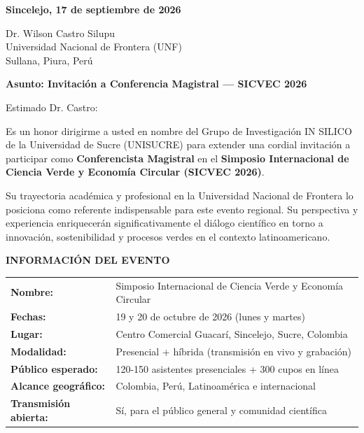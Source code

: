 \documentclass[12pt,a4paper]{article}
\begin{document}
\vspace{0.5cm}

\noindent
\textbf{Sincelejo, 17 de septiembre de 2026}

\vspace{0.8cm}

\noindent
Dr. Wilson Castro Silupu\\
Universidad Nacional de Frontera (UNF)\\
Sullana, Piura, Perú

\vspace{0.8cm}

\noindent
\textbf{\large Asunto: Invitación a Conferencia Magistral — SICVEC 2026}

\vspace{0.8cm}

Estimado Dr. Castro:

\vspace{0.8cm}

Es un honor dirigirme a usted en nombre del Grupo de Investigación IN SILICO de la Universidad de Sucre (UNISUCRE) para extender una cordial invitación a participar como \textbf{Conferencista Magistral} en el \textbf{Simposio Internacional de Ciencia Verde y Economía Circular (SICVEC 2026)}.

Su trayectoria académica y profesional en la Universidad Nacional de Frontera lo posiciona como referente indispensable para este evento regional. Su perspectiva y experiencia enriquecerán significativamente el diálogo científico en torno a innovación, sostenibilidad y procesos verdes en el contexto latinoamericano.

\vspace{0.5cm}

\noindent
\textbf{INFORMACIÓN DEL EVENTO}

\begin{tabular}{ll}
\textbf{Nombre:} & Simposio Internacional de Ciencia Verde y Economía Circular \\
\textbf{Fechas:} & 19 y 20 de octubre de 2026 (lunes y martes) \\
\textbf{Lugar:} & Centro Comercial Guacarí, Sincelejo, Sucre, Colombia \\
\textbf{Modalidad:} & Presencial + híbrida (transmisión en vivo y grabación) \\
\textbf{Público esperado:} & 120-150 asistentes presenciales + 300 cupos en línea \\
\textbf{Alcance geográfico:} & Colombia, Perú, Latinoamérica e internacional \\
\textbf{Transmisión abierta:} & Sí, para el público general y comunidad científica \\
\end{tabular}
\end{document}
